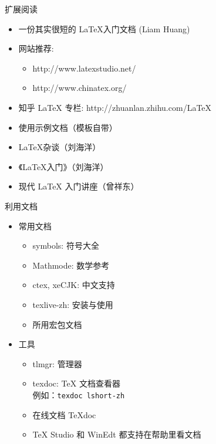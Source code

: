 \begin{frame}{扩展阅读}
  \begin{itemize}
    \item 一份其实很短的 \LaTeX 入门文档 (Liam Huang) 
    \item 网站推荐:
      \begin{itemize}
        \item http://www.latexstudio.net/
        \item http://www.chinatex.org/
      \end{itemize}
    \item 知乎 LaTeX 专栏: http://zhuanlan.zhihu.com/LaTeX
    \item \ThuThesis{}使用示例文档（模板自带）
    \item \LaTeX{}杂谈（刘海洋）
    \item 《\LaTeX{}入门》（刘海洋）
    \item 现代 LaTeX 入门讲座（曾祥东）
  \end{itemize}
\end{frame}


\begin{frame}{利用文档}
  \begin{itemize}
    \item 常用文档
      \begin{itemize}
        \item symbols: 符号大全
        \item Mathmode: 数学参考
        \item ctex, xeCJK: 中文支持
        \item texlive-zh: \TL 安装与使用
        \item 所用宏包文档
      \end{itemize}
    \item 工具
      \begin{itemize}
        \item tlmgr: \TL 管理器
        \item texdoc: \TeX{} 文档查看器\\
          例如：\texttt{texdoc lshort-zh}
        \item 在线文档 \TeX{}doc 
        \item TeX Studio 和 WinEdt 都支持在帮助里看文档
      \end{itemize}
  \end{itemize}
\end{frame}


